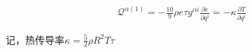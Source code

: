 \documentclass[LBMDerivation.tex]{subfiles}
\begin{document}
\begin{equation}
  \begin{gathered}
    \mathcal{Q}^{\alpha (1)}
    = -\frac{10}{9}\rho e \tau g^{\alpha i}\frac{\partial e}{\partial q^i} = -\kappa \frac{\partial T}{\partial q^i} 
  \end{gathered}
\end{equation}

记，热传导率$\kappa=\frac{5}{2}\rho R^2 T \tau$










\end{document}
